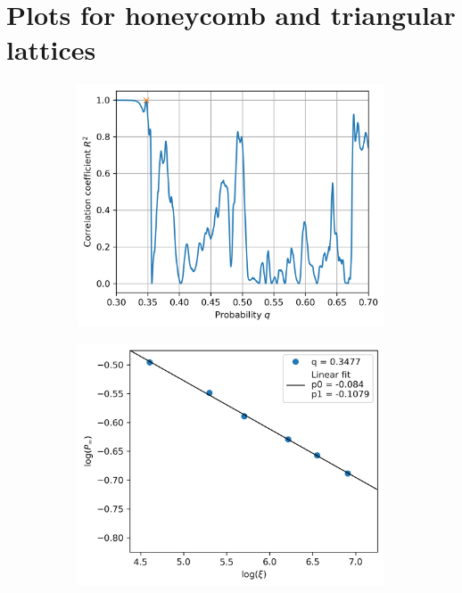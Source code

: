\documentclass[a4paper]{article}
\begin{document}
\section*{Plots for honeycomb and triangular lattices\label{sec:plots}}
\begin{figure}[h]
    \centering
    \begin{subfigure}[b]{0.49\textwidth}
        \includegraphics[width=\textwidth]{triangular_rsquared.png}
        \caption{}
    \end{subfigure}
    \begin{subfigure}[b]{0.49\textwidth}
        \includegraphics[width=\textwidth]{triangular_giant_vs_xi.png}

\end{subfigure}
\end{figure}
\end{document}
